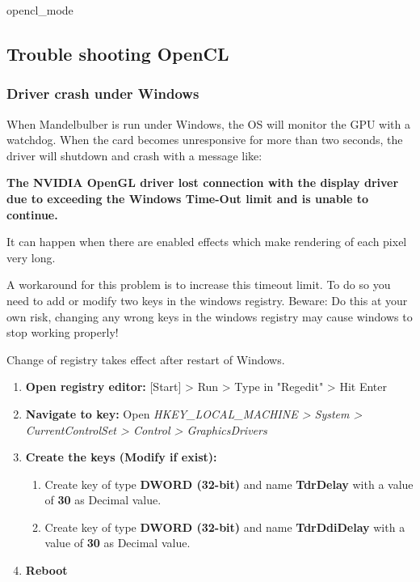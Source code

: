 	{opencl_mode}

\subsection{Trouble shooting OpenCL}\label{opencl-troubleshooting}

\subsubsection{Driver crash under Windows}

When Mandelbulber is run under Windows, the OS will monitor the GPU with a watchdog. When the card becomes unresponsive for more than two seconds, the driver will shutdown and crash with a message like:

\textbf{The NVIDIA OpenGL driver lost connection with the display driver due to exceeding the Windows Time-Out limit and is unable to continue.}

It can happen when there are enabled effects which make rendering of each pixel very long. 

A workaround for this problem is to increase this timeout limit. To do so you need to add or modify two keys in the windows registry. Beware: Do this at your own risk, changing any wrong keys in the windows registry may cause windows to stop working properly!

Change of registry takes effect after restart of Windows.

\begin{enumerate}
	
	\item \textbf{Open registry editor:} [Start] > Run > Type in "Regedit" > Hit Enter
	\item \textbf{Navigate to key:} Open \emph{HKEY\_LOCAL\_MACHINE > System > CurrentControlSet > Control > GraphicsDrivers}
	\item \textbf{Create the keys (Modify if exist):}
	\begin{enumerate}
		\item Create key of type \textbf{DWORD (32-bit)} and name \textbf{TdrDelay} with a value of \textbf{30} as Decimal value.
		\item Create key of type \textbf{DWORD (32-bit)} and name \textbf{TdrDdiDelay} with a value of \textbf{30} as Decimal value.	
	\end{enumerate}	
	\item \textbf{Reboot}

\end{enumerate}

